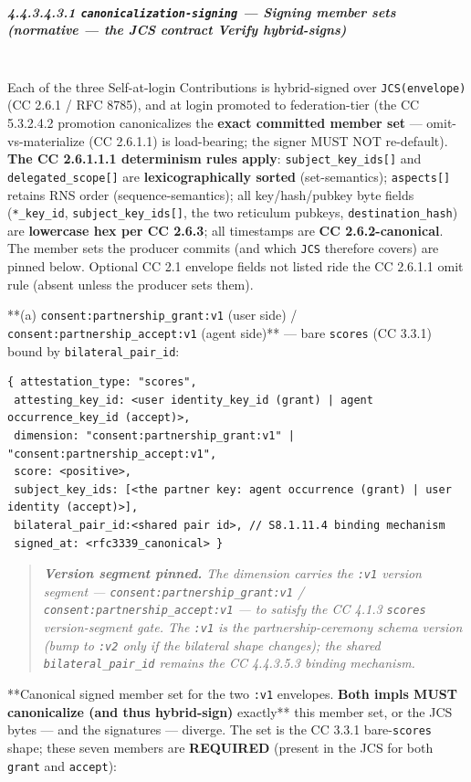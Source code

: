 \documentclass[11pt]{article}
\begin{document}
\subparagraph{4.4.3.4.3.1 \texttt{canonicalization-signing} — Signing member sets (normative — the JCS contract Verify hybrid-signs)}\mbox{}\\


Each of the three Self-at-login Contributions is hybrid-signed over \texttt{JCS(envelope)} (CC 2.6.1 / RFC 8785), and at login promoted to federation-tier (the CC 5.3.2.4.2 promotion canonicalizes the \textbf{exact committed member set} — omit-vs-materialize (CC 2.6.1.1) is load-bearing; the signer MUST NOT re-default). \textbf{The CC 2.6.1.1.1 determinism rules apply}: \texttt{subject\_key\_ids[]} and \texttt{delegated\_scope[]} are \textbf{lexicographically sorted} (set-semantics); \texttt{aspects[]} retains RNS order (sequence-semantics); all key/hash/pubkey byte fields (\texttt{*\_key\_id}, \texttt{subject\_key\_ids[]}, the two reticulum pubkeys, \texttt{destination\_hash}) are \textbf{lowercase hex per CC 2.6.3}; all timestamps are \textbf{CC 2.6.2-canonical}. The member sets the producer commits (and which \texttt{JCS} therefore covers) are pinned below. Optional CC 2.1 envelope fields not listed ride the CC 2.6.1.1 omit rule (absent unless the producer sets them).


**(a) \texttt{consent:partnership\_grant:v1} (user side) / \texttt{consent:partnership\_accept:v1} (agent side)** — bare \texttt{scores} (CC 3.3.1) bound by \texttt{bilateral\_pair\_id}:

\begin{lstlisting}
{ attestation_type: "scores",
 attesting_key_id: <user identity_key_id (grant) | agent occurrence_key_id (accept)>,
 dimension: "consent:partnership_grant:v1" | "consent:partnership_accept:v1",
 score: <positive>,
 subject_key_ids: [<the partner key: agent occurrence (grant) | user identity (accept)>],
 bilateral_pair_id:<shared pair id>, // S8.1.11.4 binding mechanism
 signed_at: <rfc3339_canonical> }
\end{lstlisting}
\begin{quote}\itshape \textbf{Version segment pinned.} The dimension carries the \texttt{:v1} version segment — \texttt{consent:partnership\_grant:v1} / \texttt{consent:partnership\_accept:v1} — to satisfy the CC 4.1.3 \texttt{scores} version-segment gate. The \texttt{:v1} is the partnership-ceremony schema version (bump to \texttt{:v2} only if the bilateral shape changes); the shared \texttt{bilateral\_pair\_id} remains the CC 4.4.3.5.3 binding mechanism.\end{quote}


**Canonical signed member set for the two \texttt{:v1} envelopes.\textbf{ Both impls MUST canonicalize (and thus hybrid-sign) }exactly** this member set, or the JCS bytes — and the signatures — diverge. The set is the CC 3.3.1 bare-\texttt{scores} shape; these seven members are \textbf{REQUIRED} (present in the JCS for both \texttt{grant} and \texttt{accept}):
\end{document}
